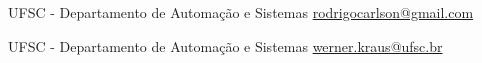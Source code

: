 
      {UFSC - Departamento de Automação e Sistemas}
      {\href{mailto:rodrigocarlson@gmail.com}{rodrigocarlson@gmail.com}}

\divider

      {UFSC - Departamento de Automação e Sistemas}
      {\href{mailto:werner.kraus@ufsc.br}{werner.kraus@ufsc.br}}
